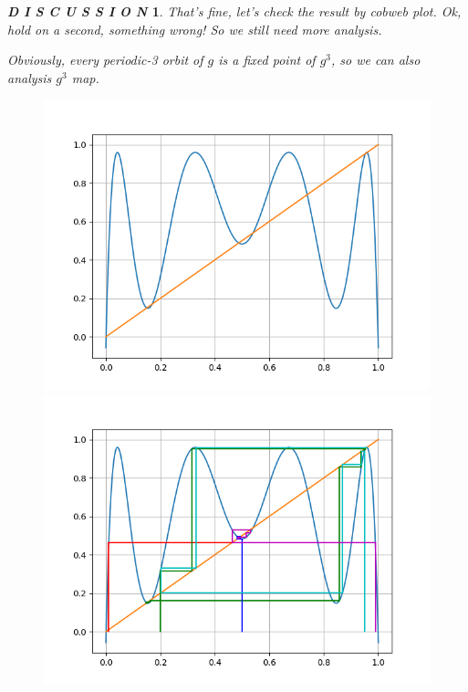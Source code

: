 \documentclass[12pt]{article}
\theoremstyle{plain}
\newtheorem{discussion}{\textit{D I S C U S S I O N}}[section]
\begin{document}
\begin{discussion}
That's fine, let's check the result by cobweb plot. Ok, hold on a second, something wrong! So we still need more analysis.

Obviously, every periodic-3 orbit of $g$ is a fixed point of $g^3$, so we can also analysis $g^3$ map.\\[3ex]

\begin{figure}[H]
\begin{minipage}[c][0.33\width]{0.33\textwidth}
   \centering
   \includegraphics[width=\textwidth]{figure/section1/g3logistic-origin.png}
\end{minipage}
\begin{minipage}[c][0.33\width]{0.33\textwidth}
   \centering
   \includegraphics[width=\textwidth]{figure/section1/g3logistic384.png}

\end{minipage}
\end{figure}
\end{discussion}
\end{document}
